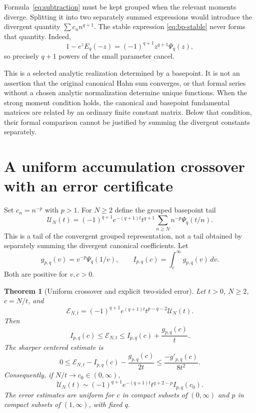 \documentclass[11pt,a4paper]{article}
\numberwithin{equation}{section}
\newtheorem{theorem}{Theorem}[section]
\theoremstyle{definition}
\theoremstyle{remark}
\begin{document}
Formula~\eqref{eq:subtraction} must be kept grouped when the relevant
moments diverge. Splitting it into two separately summed expressions would
introduce the divergent quantity $\sum c_nn^{q+1}$. The stable expression
\eqref{eq:bp-stable} never forms that quantity. Indeed,
\[
 1-e^zE_q(-z)=(-1)^{q+1}z^{q+1}\Psi_q(z),
\]
so precisely $q+1$ powers of the small parameter cancel.

This is a selected analytic realization determined by a basepoint. It is
not an assertion that the original canonical Hahn sum converges, or that
formal series without a chosen analytic normalization determine unique
functions. When the strong moment condition holds, the canonical and
basepoint fundamental matrices are related by an ordinary finite constant
matrix. Below that condition, their formal comparison cannot be justified
by summing the divergent constants separately.

\section{A uniform accumulation crossover with an error certificate}
\label{sec:crossover}

Set $c_n=n^{-p}$ with $p>1$. For $N\geq2$ define the grouped basepoint tail
\begin{equation}\label{eq:tail}
 \mathcal U_N(t)=(-1)^{q+1}e^{-(q+1)t}t^{q+1}
                    \sum_{n\geq N}n^{-p}\Psi_q(t/n).
\end{equation}
This is a tail of the convergent grouped representation, not a tail
obtained by separately summing the divergent canonical coefficients.
Let
\begin{equation}\label{eq:gI}
 g_{p,q}(v)=v^{-p}\Psi_q(1/v),\qquad
 I_{p,q}(c)=\int_c^\infty g_{p,q}(v)\,dv.
\end{equation}
Both are positive for $v,c>0$.

\begin{theorem}[Uniform crossover and explicit two-sided error]
\label{thm:crossover}
Let $t>0$, $N\geq2$, $c=N/t$, and
\[
 \mathcal E_{N,t}=(-1)^{q+1}e^{(q+1)t}t^{p-q-2}\mathcal U_N(t).
\]
Then
\begin{equation}\label{eq:rectangle}
 I_{p,q}(c)\leq\mathcal E_{N,t}
       \leq I_{p,q}(c)+\frac{g_{p,q}(c)}{t}.
\end{equation}
The sharper centered estimate is
\begin{equation}\label{eq:trapezoid}
 0\leq\mathcal E_{N,t}-I_{p,q}(c)-\frac{g_{p,q}(c)}{2t}
       \leq\frac{-g'_{p,q}(c)}{8t^2}.
\end{equation}
Consequently, if $N/t\to c_0\in(0,\infty)$,
\[
 \mathcal U_N(t)
 \sim(-1)^{q+1}e^{-(q+1)t}t^{q+2-p}I_{p,q}(c_0).
\]
The error estimates are uniform for $c$ in compact subsets of $(0,\infty)$
and $p$ in compact subsets of $(1,\infty)$, with fixed $q$.
\end{theorem}
\end{document}
